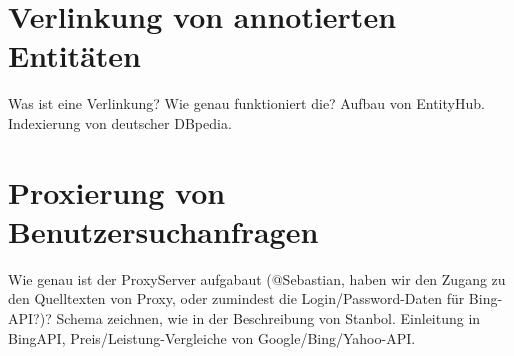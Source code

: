\section{Verlinkung von annotierten Entitäten}
Was ist eine Verlinkung? Wie genau funktioniert die? Aufbau von EntityHub. Indexierung von deutscher DBpedia.

\section{Proxierung von Benutzersuchanfragen}
Wie genau ist der ProxyServer aufgabaut (@Sebastian, haben wir den Zugang zu den Quelltexten von Proxy, oder zumindest die Login/Password-Daten für Bing-API?)? Schema zeichnen, wie in der Beschreibung von Stanbol. Einleitung in BingAPI, Preis/Leistung-Vergleiche von Google/Bing/Yahoo-API.